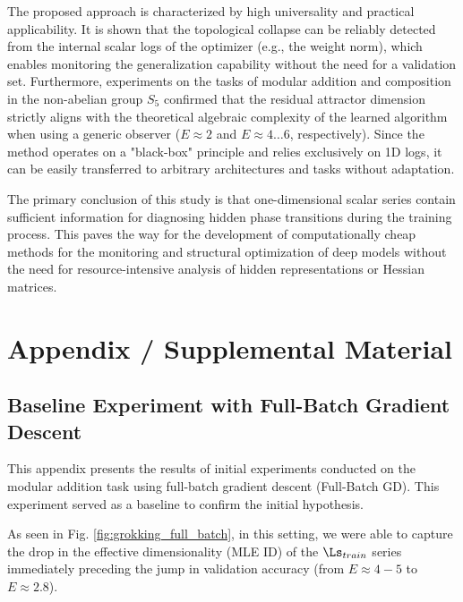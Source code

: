 \documentclass{article}
\begin{document}
The proposed approach is characterized by high universality and practical applicability. It is shown that the topological collapse can be reliably detected from the internal scalar logs of the optimizer (e.g., the weight norm), which enables monitoring the generalization capability without the need for a validation set. Furthermore, experiments on the tasks of modular addition and composition in the non-abelian group $S_5$ confirmed that the residual attractor dimension strictly aligns with the theoretical algebraic complexity of the learned algorithm when using a generic observer ($E \approx 2$ and $E \approx 4 \dots 6$, respectively). Since the method operates on a "black-box" principle and relies exclusively on 1D logs, it can be easily transferred to arbitrary architectures and tasks without adaptation.

The primary conclusion of this study is that one-dimensional scalar series contain sufficient information for diagnosing hidden phase transitions during the training process. This paves the way for the development of computationally cheap methods for the monitoring and structural optimization of deep models without the need for resource-intensive analysis of hidden representations or Hessian matrices.







\section{Appendix / Supplemental Material}\label{app}

\subsection{Baseline Experiment with Full-Batch Gradient Descent}\label{app:exp}

This appendix presents the results of initial experiments conducted on the modular addition task using full-batch gradient descent (Full-Batch GD). This experiment served as a baseline to confirm the initial hypothesis.

As seen in Fig. \ref{fig:grokking_full_batch}, in this setting, we were able to capture the drop in the effective dimensionality (MLE ID) of the $\Ls_{train}$ series immediately preceding the jump in validation accuracy (from $E \approx 4-5$ to $E \approx 2.8$).
\end{document}
